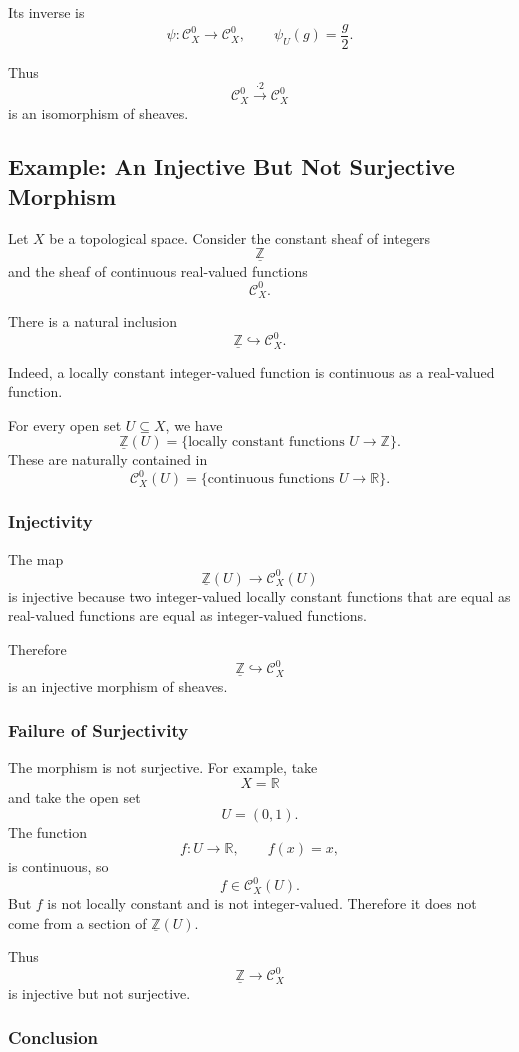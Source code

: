 \documentclass[12pt,a4paper]{article}
\newcommand{\RR}{\mathbb{R}}
\newcommand{\ZZ}{\mathbb{Z}}
\newcommand{\Czero}{\mathcal C^0}        %
\theoremstyle{notespace}
\begin{document}
Its inverse is
\[
\psi:\Czero_X\to \Czero_X,
\qquad
\psi_U(g)=\frac{g}{2}.
\]

Thus
\[
\boxed{
	\Czero_X\xrightarrow{\cdot 2}\Czero_X
}
\]
is an isomorphism of sheaves.

\subsection{Example: An Injective But Not Surjective Morphism}

Let \(X\) be a topological space. Consider the constant sheaf of integers
\[
\underline{\ZZ}
\]
and the sheaf of continuous real-valued functions
\[
\Czero_X.
\]

There is a natural inclusion
\[
\underline{\ZZ}\hookrightarrow \Czero_X.
\]

Indeed, a locally constant integer-valued function is continuous as a real-valued function.

For every open set \(U\subseteq X\), we have
\[
\underline{\ZZ}(U)
=
\{\text{locally constant functions }U\to \ZZ\}.
\]
These are naturally contained in
\[
\Czero_X(U)
=
\{\text{continuous functions }U\to \RR\}.
\]

\subsubsection*{Injectivity}

The map
\[
\underline{\ZZ}(U)\to \Czero_X(U)
\]
is injective because two integer-valued locally constant functions that are equal as real-valued functions are equal as integer-valued functions.

Therefore
\[
\underline{\ZZ}\hookrightarrow \Czero_X
\]
is an injective morphism of sheaves.

\subsubsection*{Failure of Surjectivity}

The morphism is not surjective. For example, take
\[
X=\RR
\]
and take the open set
\[
U=(0,1).
\]
The function
\[
f:U\to \RR,
\qquad
f(x)=x,
\]
is continuous, so
\[
f\in \Czero_X(U).
\]
But \(f\) is not locally constant and is not integer-valued. Therefore it does not come from a section of \(\underline{\ZZ}(U)\).

Thus
\[
\underline{\ZZ}\to \Czero_X
\]
is injective but not surjective.

\subsubsection*{Conclusion}
\end{document}
